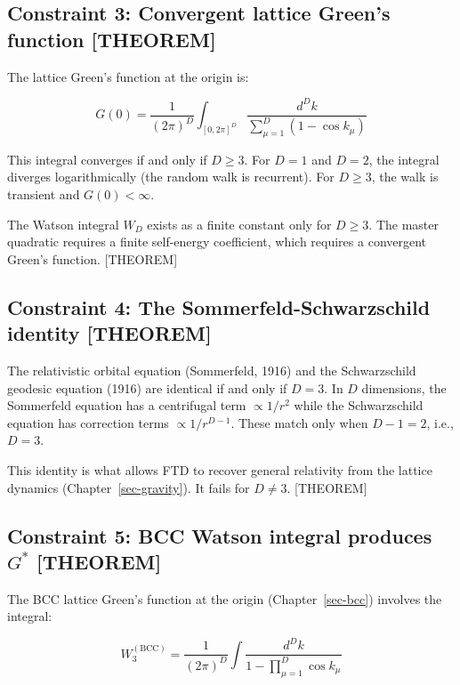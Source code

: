 \documentclass[
  11pt,
  letterpaper,
  twoside,
  openright]{book}
\begin{document}
\subsection{Constraint 3: Convergent lattice Green's function
{[}THEOREM{]}}\label{constraint-3-convergent-lattice-greens-function-theorem}

The lattice Green's function at the origin is:

\[
G(0) = \frac{1}{(2\pi)^D} \int_{[0,2\pi]^D} \frac{d^D k}{\sum_{\mu=1}^D (1 - \cos k_\mu)}
\]

This integral converges if and only if \(D \geq 3\). For \(D = 1\) and
\(D = 2\), the integral diverges logarithmically (the random walk is
recurrent). For \(D \geq 3\), the walk is transient and
\(G(0) < \infty\).

The Watson integral \(W_D\) exists as a finite constant only for
\(D \geq 3\). The master quadratic requires a finite self-energy
coefficient, which requires a convergent Green's function. {[}THEOREM{]}

\subsection{Constraint 4: The Sommerfeld-Schwarzschild identity
{[}THEOREM{]}}\label{constraint-4-the-sommerfeld-schwarzschild-identity-theorem}

The relativistic orbital equation (Sommerfeld, 1916) and the
Schwarzschild geodesic equation (1916) are identical if and only if
\(D = 3\). In \(D\) dimensions, the Sommerfeld equation has a
centrifugal term \(\propto 1/r^2\) while the Schwarzschild equation has
correction terms \(\propto 1/r^{D-1}\). These match only when
\(D - 1 = 2\), i.e., \(D = 3\).

This identity is what allows FTD to recover general relativity from the
lattice dynamics (Chapter~\ref{sec-gravity}). It fails for \(D \neq 3\).
{[}THEOREM{]}

\subsection{\texorpdfstring{Constraint 5: BCC Watson integral produces
\(G^*\)
{[}THEOREM{]}}{Constraint 5: BCC Watson integral produces G\^{}* {[}THEOREM{]}}}\label{constraint-5-bcc-watson-integral-produces-g-theorem}

The BCC lattice Green's function at the origin (Chapter~\ref{sec-bcc})
involves the integral:

\[
W_3^{(\text{BCC})} = \frac{1}{(2\pi)^D} \int \frac{d^D k}{1 - \prod_{\mu=1}^D \cos k_\mu}
\]
\end{document}

